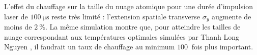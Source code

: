 L'effet du chauffage sur la taille du nuage atomique pour une durée d'impulsion laser de $\SI{100}{\us}$ reste très limité : l'extension spatiale transverse $\sigma_y$ augmente de moins de $\SI{2}{\percent}$.
La même simulation montre que, pour atteindre les tailles de nuage correspondant aux températures optimales simulées par Thanh Long Nguyen \cite{PHD_NGUYEN}, il faudrait un taux de chauffage au minimum $\SI{100}{}$ fois plus important.


%
%
%
%
%
%
%
